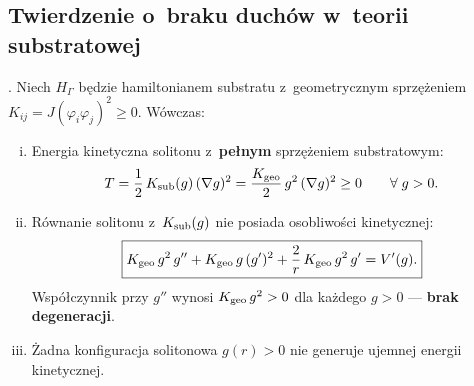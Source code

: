 \subsection{Twierdzenie o~braku duchów w~teorii substratowej}%
\label{ssec:ghost-free-substrate}

\begin{theorem}%
\label{thm:ghost-free-soliton}
.
Niech $H_\Gamma$ będzie hamiltonianem substratu
z~geometrycznym sprzężeniem $K_{ij} = J(\varphi_i\varphi_j)^2 \geq 0$.
Wówczas:
\begin{enumerate}[(i)]
  \item Energia kinetyczna solitonu z~\textbf{pełnym}
    sprzężeniem substratowym:
    \begin{equation}\label{eq:T-substrate}
      T = \frac{1}{2}\,K_{\rm sub}(g)\,(\nabla g)^2
        = \frac{K_{\rm geo}}{2}\,g^2\,(\nabla g)^2
        \geq 0
        \qquad \forall\; g > 0.
    \end{equation}
  \item Równanie solitonu z~$K_{\rm sub}(g)$ nie posiada
    osobliwości kinetycznej:
    \begin{equation}\label{eq:soliton-substrate}
      \boxed{
        K_{\rm geo}\,g^2\,g''
        + K_{\rm geo}\,g\,(g')^2
        + \frac{2}{r}\,K_{\rm geo}\,g^2\,g'
        = V'(g).
      }
    \end{equation}
    Współczynnik przy $g''$ wynosi $K_{\rm geo}\,g^2 > 0$
    dla każdego $g > 0$ --- \textbf{brak degeneracji}.
  \item Żadna konfiguracja solitonowa $g(r) > 0$
    nie generuje ujemnej energii kinetycznej.
\end{enumerate}
\end{theorem}

